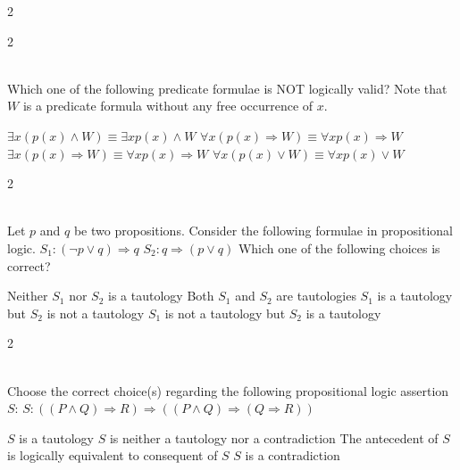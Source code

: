 \documentclass[12pt]{exam}
\begin{document}
\begin{questions}
\begin{multicols*}{2}
\end{multicols*}
\vspace{0.6cm}
\newpage
\begin{multicols*}{2}

 \\[0.2cm]
{\Large Which one of the following predicate formulae is NOT logically valid? Note that $W$ is a predicate formula without any free occurrence of $x$.}
\begin{choices}
  \choice $\exists x (p(x) \wedge W) \equiv \exists x p(x) \wedge W$
  \choice $\forall x (p(x) \Rightarrow W) \equiv \forall x p(x) \Rightarrow W$
  \choice $\exists x (p(x) \Rightarrow W) \equiv \forall x p(x) \Rightarrow W$
  \choice $\forall x (p(x) \vee W) \equiv \forall x p(x) \vee W$
\end{choices}

\end{multicols*}
\vspace{0.6cm}
\newpage
\begin{multicols*}{2}

 \\[0.2cm]
{\Large Let $p$ and $q$ be two propositions. Consider the following formulae in propositional logic.\newline
$S_1: (\neg p \vee q) \Rightarrow q$\newline
$S_2: q \Rightarrow (p \vee q)$\newline
Which one of the following choices is correct?}
\begin{choices}
  \choice Neither $S_1$ nor $S_2$ is a tautology
  \choice Both $S_1$ and $S_2$ are tautologies
  \choice $S_1$ is a tautology but $S_2$ is not a tautology
  \choice $S_1$ is not a tautology but $S_2$ is a tautology
\end{choices}

\end{multicols*}
\vspace{0.6cm}
\newpage
\begin{multicols*}{2}

 \\[0.2cm]
{\Large Choose the correct choice(s) regarding the following propositional logic assertion $S$:\newline
$S: ((P \wedge Q) \Rightarrow R) \Rightarrow ((P \wedge Q) \Rightarrow (Q \Rightarrow R))$}
\begin{choices}
  \choice $S$ is a tautology
  \choice $S$ is neither a tautology nor a contradiction
  \choice The antecedent of $S$ is logically equivalent to consequent of $S$
  \choice $S$ is a contradiction
\end{choices}


\end{multicols*}
\end{questions}
\end{document}
